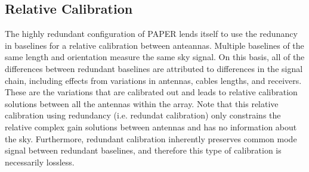 \documentclass[twocolumn,numberedappendix]{emulateapj} \shorttitle{PSA64}
\begin{document}
\subsection{Relative Calibration}
%         
%

The highly redundant configuration of PAPER lends itself to
use the redunancy in baselines for a relative calibration between anteannas.
Multiple baselines of the same length and orientation measure the same sky
signal. On this basis, all of the differences between redundant baselines are
attributed to differences in the signal chain, including effects from variations
in antennas, cables lengths, and receivers. These are the variations that are
calibrated out and leads to relative calibration solutions between all the
antennas within the array.  Note that this relative calibration using redundancy
(i.e. redundat calibration) only constrains the relative complex gain solutions
between antennas and has no information about the sky. Furthermore, redundant
calibration inherently preserves common mode signal between redundant baselines,
and therefore this type of calibration is necessarily lossless. 
\end{document}
